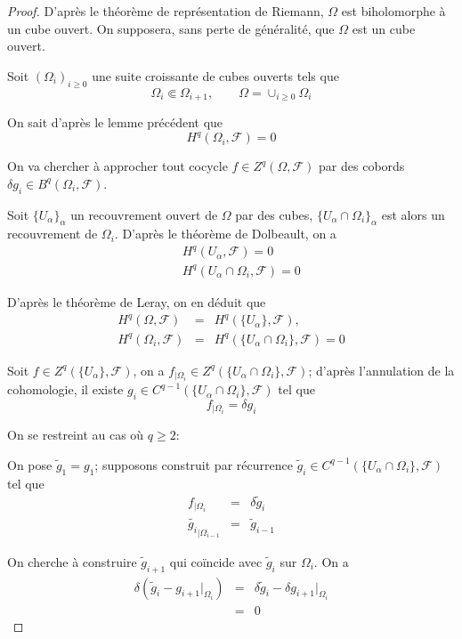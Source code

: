 \documentclass{article}
\theoremstyle{definition}
\theoremstyle{remarque}
\begin{document}
\begin{proof}
D'après le théorème de représentation de Riemann, $\Omega$ est biholomorphe à un cube ouvert. On supposera, sans perte de généralité, que $\Omega$ est un cube ouvert.

Soit $(\Omega_i)_{i \geq 0}$ une suite croissante de cubes ouverts tels que
\begin{equation*}
\Omega_i \Subset \Omega_{i+1}, \qquad
\Omega = \cup_{i \geq 0} \Omega_i
\end{equation*}

On sait d'après le lemme précédent que
$$H^q(\Omega_i, \mathcal{F})=0$$

On va chercher à approcher tout cocycle $f \in Z^q(\Omega, \mathcal{F})$ par des cobords $\delta g_i \in B^q(\Omega_i, \mathcal{F})$.

Soit $\{U_\alpha\}_\alpha$ un recouvrement ouvert de $\Omega$ par des cubes, $\{U_\alpha \cap \Omega_i\}_\alpha$ est alors un recouvrement de $\Omega_i$. D'après le théorème de Dolbeault, on a
\begin{eqnarray}
\nonumber &&H^q(U_\alpha, \mathcal{F}) = 0 \\
\nonumber &&H^q(U_\alpha \cap \Omega_i, \mathcal{F}) = 0
\end{eqnarray}


D'après le théorème de Leray, on en déduit que
\begin{eqnarray}
\nonumber H^q(\Omega, \mathcal{F}) &=& H^q(\{U_\alpha\}, \mathcal{F}), \\
\nonumber H^q(\Omega_i, \mathcal{F}) &=& H^q(\{U_\alpha \cap \Omega_i\}, \mathcal{F})=0
\end{eqnarray}

Soit $f \in Z^q(\{U_\alpha\}, \mathcal{F})$, on a $f_{|\Omega_i} \in Z^q(\{U_\alpha\cap \Omega_i\}, \mathcal{F})$; d'après l'annulation de la cohomologie, il existe $g_i \in C^{q-1}(\{U_\alpha\cap \Omega_i\}, \mathcal{F})$ tel que
$$f_{|\Omega_i} = \delta g_i$$

On se restreint au cas où $q \geq 2$:

On pose $\tilde{g}_1=g_1$; supposons construit par récurrence $\tilde{g}_i \in  C^{q-1}(\{U_\alpha\cap \Omega_i\}, \mathcal{F})$ tel que
\begin{eqnarray}
\nonumber f_{|\Omega_i} &=& \delta \tilde{g}_i \\
\nonumber \tilde{g_i}_{|\Omega_{i-1}} &=& \tilde{g}_{i-1}
\end{eqnarray}

On cherche à construire $\tilde{g}_{i+1}$ qui coïncide avec $\tilde{g}_i$ sur $\Omega_i$. On a
\begin{eqnarray}
\nonumber \delta(\tilde{g}_i - g_{i+1}{|_{\Omega_{i}}})&=& \delta \tilde{g}_i  - \delta g_{i+1}{|_{\Omega_{i}}}\\
\nonumber &=& 0
\end{eqnarray}


\end{proof}
\end{document}
